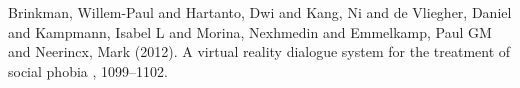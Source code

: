 \documentclass[twoside]{article}
\begin{document}
\begin{multicols}{2}
\begin{thebibliography}{99}
Brinkman, Willem-Paul and Hartanto, Dwi and Kang, Ni and de Vliegher, Daniel and Kampmann, Isabel L and Morina, Nexhmedin and Emmelkamp, Paul GM and Neerincx, Mark (2012).
\newblock A virtual reality dialogue system for the treatment of social phobia
, 1099--1102.


\end{thebibliography}


\end{multicols}
\end{document}
